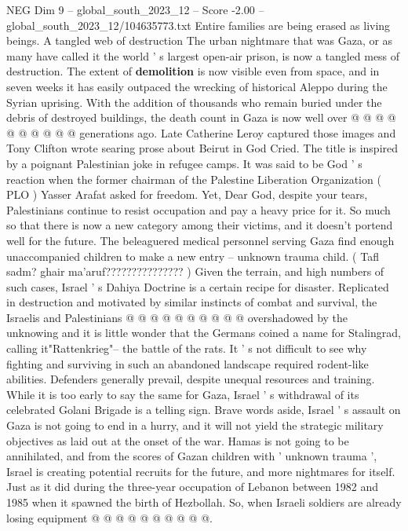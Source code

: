 \begin{textsample}{NEG Dim 9 – global\_south\_2023\_12 – Score -2.00 – global\_south\_2023\_12/104635773.txt}
Entire families are being erased as living beings.
A tangled web of destruction The urban nightmare that was Gaza, or as many have called it the world ' s largest open-air prison, is now a tangled mess of destruction.
The extent of \textbf{demolition} is now visible even from space, and in seven weeks it has easily outpaced the wrecking of historical Aleppo during the Syrian uprising.
With the addition of thousands who remain buried under the debris of destroyed buildings, the death count in Gaza is now well over @ @ @ @ @ @ @ @ @ @ generations ago.
Late Catherine Leroy captured those images and Tony Clifton wrote searing prose about Beirut in God Cried.
The title is inspired by a poignant Palestinian joke in refugee camps.
It was said to be God ' s reaction when the former chairman of the Palestine Liberation Organization ( PLO ) Yasser Arafat asked for freedom.
Yet, Dear God, despite your tears, Palestinians continue to resist occupation and pay a heavy price for it.
So much so that there is now a new category among their victims, and it doesn't portend well for the future.
The beleaguered medical personnel serving Gaza find enough unaccompanied children to make a new entry -- unknown trauma child. ( Tafl sadm? ghair ma'aruf??????????????? ) Given the terrain, and high numbers of such cases, Israel ' s Dahiya Doctrine is a certain recipe for disaster.
Replicated in destruction and motivated by similar instincts of combat and survival, the Israelis and Palestinians @ @ @ @ @ @ @ @ @ @ overshadowed by the unknowing and it is little wonder that the Germans coined a name for Stalingrad, calling it"Rattenkrieg"-- the battle of the rats.
It ' s not difficult to see why fighting and surviving in such an abandoned landscape required rodent-like abilities.
Defenders generally prevail, despite unequal resources and training.
While it is too early to say the same for Gaza, Israel ' s withdrawal of its celebrated Golani Brigade is a telling sign.
Brave words aside, Israel ' s assault on Gaza is not going to end in a hurry, and it will not yield the strategic military objectives as laid out at the onset of the war.
Hamas is not going to be annihilated, and from the scores of Gazan children with ' unknown trauma ', Israel is creating potential recruits for the future, and more nightmares for itself.
Just as it did during the three-year occupation of Lebanon between 1982 and 1985 when it spawned the birth of Hezbollah.
So, when Israeli soldiers are already losing equipment @ @ @ @ @ @ @ @ @ @.

\end{textsample}
